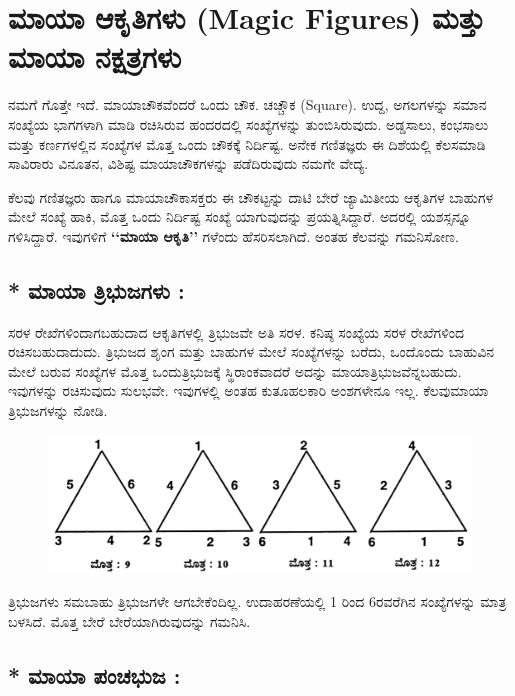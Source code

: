 \chapter{ಮಾಯಾ ಆಕೃತಿಗಳು (Magic Figures) ಮತ್ತು ಮಾಯಾ ನಕ್ಷತ್ರಗಳು}

ನಮಗೆ ಗೊತ್ತೇ ಇದೆ. ಮಾಯಾಚೌಕವೆಂದರೆ ಒಂದು ಚೌಕ. ಚಚ್ಚೌಕ (Square). ಉದ್ದ, ಅಗಲಗಳನ್ನು ಸಮಾನ ಸಂಖ್ಯೆಯ ಭಾಗಗಳಾಗಿ ಮಾಡಿ ರಚಿಸಿರುವ ಹಂದರದಲ್ಲಿ ಸಂಖ್ಯೆ\-ಗಳನ್ನು ತುಂಬಿಸಿರುವುದು. ಅಡ್ಡಸಾಲು, ಕಂಭಸಾಲು ಮತ್ತು ಕರ್ಣಗಳಲ್ಲಿನ ಸಂಖ್ಯೆಗಳ ಮೊತ್ತ ಒಂದು ಚೌಕಕ್ಕೆ ನಿರ್ದಿಷ್ಟ. ಅನೇಕ ಗಣಿತಜ್ಞರು ಈ ದಿಶೆಯಲ್ಲಿ ಕೆಲಸಮಾಡಿ ಸಾವಿರಾರು ವಿನೂತನ, ವಿಶಿಷ್ಟ ಮಾಯಾಚೌಕಗಳನ್ನು ಪಡೆದಿರುವುದು ನಮಗೇ ವೇದ್ಯ.

ಕೆಲವು ಗಣಿತಜ್ಞರು ಹಾಗೂ ಮಾಯಾಚೌಕಾಸಕ್ತರು ಈ ಚೌಕಟ್ಟನ್ನು ದಾಟಿ ಬೇರೆ ಜ್ಯಾಮಿತೀಯ ಆಕೃತಿಗಳ ಬಾಹುಗಳ ಮೇಲೆ ಸಂಖ್ಯೆ ಹಾಕಿ, ಮೊತ್ತ ಒಂದು ನಿರ್ದಿಷ್ಟ ಸಂಖ್ಯೆ ಯಾಗುವುದನ್ನು ಪ್ರಯತ್ನಿಸಿದ್ದಾರೆ. ಅದರಲ್ಲಿ ಯಶಸ್ಸನ್ನೂ ಗಳಿಸಿದ್ದಾರೆ. ಇವುಗಳಿಗೆ \textbf{‘‘ಮಾಯಾ ಆಕೃತಿ’’} ಗಳೆಂದು ಹೆಸರಿಸಲಾಗಿದೆ. ಅಂತಹ ಕೆಲವನ್ನು ಗಮನಿಸೋಣ.

\section*{* ಮಾಯಾ ತ್ರಿಭುಜಗಳು :}

ಸರಳ ರೇಖೆಗಳಿಂದಾಗಬಹುದಾದ ಆಕೃತಿಗಳಲ್ಲಿ ತ್ರಿಭುಜವೇ ಅತಿ ಸರಳ. ಕನಿಷ್ಠ ಸಂಖ್ಯೆಯ ಸರಳ ರೇಖೆಗಳಿಂದ ರಚಿಸಬಹುದಾದುದು. ತ್ರಿಭುಜದ ಶೃಂಗ ಮತ್ತು ಬಾಹುಗಳ ಮೇಲೆ ಸಂಖ್ಯೆ\-ಗಳನ್ನು ಬರೆದು, ಒಂದೊಂದು ಬಾಹುವಿನ ಮೇಲೆ ಬರುವ ಸಂಖ್ಯೆಗಳ ಮೊತ್ತ ಒಂದು\break ತ್ರಿಭುಜಕ್ಕೆ ಸ್ಥಿರಾಂಕವಾದರೆ ಅದನ್ನು ಮಾಯಾತ್ರಿಭುಜವೆನ್ನಬಹುದು. ಇವುಗಳನ್ನು ರಚಿಸು\-ವುದು ಸುಲಭವೇ. ಇವುಗಳಲ್ಲಿ ಅಂತಹ ಕುತೂಹಲಕಾರಿ ಅಂಶಗಳೇನೂ ಇಲ್ಲ. ಕೆಲವು\break ಮಾಯಾ ತ್ರಿಭುಜಗಳನ್ನು ನೋಡಿ.
\begin{figure}[H]
\includegraphics[scale=0.8]{src/figures/chap8/fig8.1.jpg}
\end{figure}

ತ್ರಿಭುಜಗಳು ಸಮಬಾಹು ತ್ರಿಭುಜಗಳೇ ಆಗಬೇಕೆಂದಿಲ್ಲ. ಉದಾಹರಣೆಯಲ್ಲಿ 1 ರಿಂದ 6ರವರೆಗಿನ ಸಂಖ್ಯೆಗಳನ್ನು ಮಾತ್ರ ಬಳಸಿದೆ. ಮೊತ್ತ ಬೇರೆ ಬೇರೆಯಾಗಿರುವುದನ್ನು ಗಮನಿಸಿ.

\section*{* ಮಾಯಾ ಪಂಚಭುಜ :}

